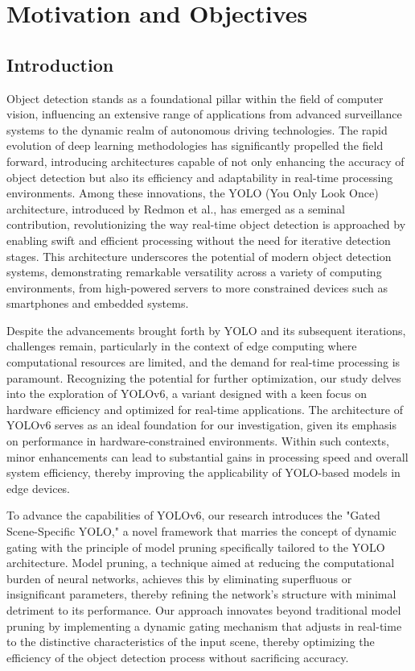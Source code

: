 \section{Motivation and Objectives}  

\subsection{Introduction}

Object detection stands as a foundational pillar within the field of computer vision, influencing an extensive range of applications from advanced surveillance systems to the dynamic realm of autonomous driving technologies. The rapid evolution of deep learning methodologies has significantly propelled the field forward, introducing architectures capable of not only enhancing the accuracy of object detection but also its efficiency and adaptability in real-time processing environments. Among these innovations, the YOLO (You Only Look Once) architecture, introduced by Redmon et al., has emerged as a seminal contribution, revolutionizing the way real-time object detection is approached by enabling swift and efficient processing without the need for iterative detection stages. This architecture underscores the potential of modern object detection systems, demonstrating remarkable versatility across a variety of computing environments, from high-powered servers to more constrained devices such as smartphones and embedded systems.

Despite the advancements brought forth by YOLO and its subsequent iterations, challenges remain, particularly in the context of edge computing where computational resources are limited, and the demand for real-time processing is paramount. Recognizing the potential for further optimization, our study delves into the exploration of YOLOv6, a variant designed with a keen focus on hardware efficiency and optimized for real-time applications. The architecture of YOLOv6 serves as an ideal foundation for our investigation, given its emphasis on performance in hardware-constrained environments. Within such contexts, minor enhancements can lead to substantial gains in processing speed and overall system efficiency, thereby improving the applicability of YOLO-based models in edge devices.

To advance the capabilities of YOLOv6, our research introduces the "Gated Scene-Specific YOLO," a novel framework that marries the concept of dynamic gating with the principle of model pruning specifically tailored to the YOLO architecture. Model pruning, a technique aimed at reducing the computational burden of neural networks, achieves this by eliminating superfluous or insignificant parameters, thereby refining the network's structure with minimal detriment to its performance. Our approach innovates beyond traditional model pruning by implementing a dynamic gating mechanism that adjusts in real-time to the distinctive characteristics of the input scene, thereby optimizing the efficiency of the object detection process without sacrificing accuracy.

